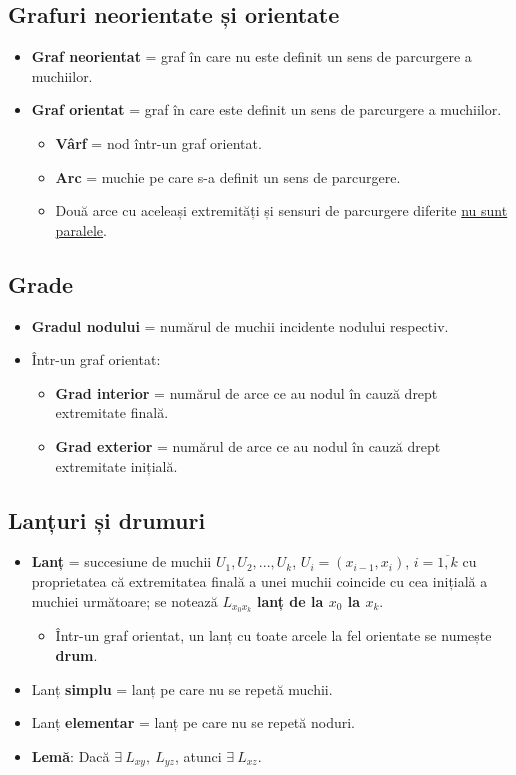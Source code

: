 \documentclass{article}
\begin{document}
\subsection*{Grafuri neorientate și orientate}
\begin{itemize}
    \item \textbf{Graf neorientat} = graf în care nu este definit un sens de parcurgere a muchiilor.
    \item \textbf{Graf orientat} = graf în care este definit un sens de parcurgere a muchiilor.
    \begin{itemize}
        \item \textbf{Vârf} = nod într-un graf orientat.
        \item \textbf{Arc} = muchie pe care s-a definit un sens de parcurgere.
        \item Două arce cu aceleași extremități și sensuri de parcurgere diferite \underline{nu sunt paralele}.
    \end{itemize}
\end{itemize}
\subsection*{Grade}
\begin{itemize}
    \item \textbf{Gradul nodului} = numărul de muchii incidente nodului respectiv.
    \item Într-un graf orientat: \begin{itemize}
        \item \textbf{Grad interior} = numărul de arce ce au nodul în cauză drept extremitate finală.
        \item \textbf{Grad exterior} = numărul de arce ce au nodul în cauză drept extremitate inițială.
    \end{itemize}
\end{itemize}
\subsection*{Lanțuri și drumuri}
\begin{itemize}
    \item \textbf{Lanț} = succesiune de muchii $U_1, U_2,...,U_k$, $U_i = (x_{i-1}, x_i)$, $i=\overline{1, k}$ cu proprietatea că extremitatea finală a unei muchii coincide cu cea inițială a muchiei următoare; se notează $L_{x_0 x_k}$ \textbf{lanț de la $x_0$ la $x_k$}.
    \begin{itemize}
        \item Într-un graf orientat, un lanț cu toate arcele la fel orientate se numește \textbf{drum}.
    \end{itemize}
    \item Lanț \textbf{simplu} = lanț pe care nu se repetă muchii.
    \item Lanț \textbf{elementar} = lanț pe care nu se repetă noduri.
    \item \textbf{Lemă}: Dacă $\exists\ L_{x y},\ L_{y z}$, atunci $\exists\ L_{x z}$.
\end{itemize}
\end{document}
